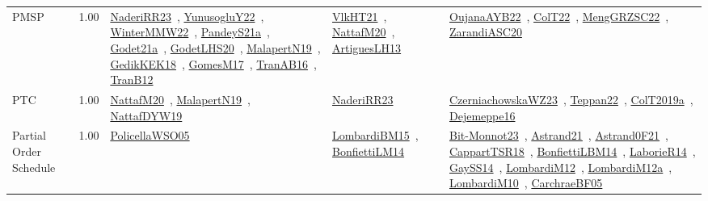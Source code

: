 {\begin{longtable}{p{3cm}r>{\raggedright\arraybackslash}p{6cm}>{\raggedright\arraybackslash}p{6cm}>{\raggedright\arraybackslash}p{8cm}}
\index{PMSP}\index{Classification!PMSP}PMSP &  1.00 & \href{../works/NaderiRR23.pdf}{NaderiRR23}~\cite{NaderiRR23}, \href{../works/YunusogluY22.pdf}{YunusogluY22}~\cite{YunusogluY22}, \href{../works/WinterMMW22.pdf}{WinterMMW22}~\cite{WinterMMW22}, \href{../works/PandeyS21a.pdf}{PandeyS21a}~\cite{PandeyS21a}, \href{../works/Godet21a.pdf}{Godet21a}~\cite{Godet21a}, \href{../works/GodetLHS20.pdf}{GodetLHS20}~\cite{GodetLHS20}, \href{../works/MalapertN19.pdf}{MalapertN19}~\cite{MalapertN19}, \href{../works/GedikKEK18.pdf}{GedikKEK18}~\cite{GedikKEK18}, \href{../works/GomesM17.pdf}{GomesM17}~\cite{GomesM17}, \href{../works/TranAB16.pdf}{TranAB16}~\cite{TranAB16}, \href{../works/TranB12.pdf}{TranB12}~\cite{TranB12} & \href{../works/VlkHT21.pdf}{VlkHT21}~\cite{VlkHT21}, \href{../works/NattafM20.pdf}{NattafM20}~\cite{NattafM20}, \href{../works/ArtiguesLH13.pdf}{ArtiguesLH13}~\cite{ArtiguesLH13} & \href{../works/OujanaAYB22.pdf}{OujanaAYB22}~\cite{OujanaAYB22}, \href{../works/ColT22.pdf}{ColT22}~\cite{ColT22}, \href{../works/MengGRZSC22.pdf}{MengGRZSC22}~\cite{MengGRZSC22}, \href{../works/ZarandiASC20.pdf}{ZarandiASC20}~\cite{ZarandiASC20}\\
\index{PTC}\index{Classification!PTC}PTC &  1.00 & \href{../works/NattafM20.pdf}{NattafM20}~\cite{NattafM20}, \href{../works/MalapertN19.pdf}{MalapertN19}~\cite{MalapertN19}, \href{../works/NattafDYW19.pdf}{NattafDYW19}~\cite{NattafDYW19} & \href{../works/NaderiRR23.pdf}{NaderiRR23}~\cite{NaderiRR23} & \href{../works/CzerniachowskaWZ23.pdf}{CzerniachowskaWZ23}~\cite{CzerniachowskaWZ23}, \href{../works/Teppan22.pdf}{Teppan22}~\cite{Teppan22}, \href{../works/ColT2019a.pdf}{ColT2019a}~\cite{ColT2019a}, \href{../works/Dejemeppe16.pdf}{Dejemeppe16}~\cite{Dejemeppe16}\\
\index{Partial Order Schedule}\index{Classification!Partial Order Schedule}Partial Order Schedule &  1.00 & \href{../works/PolicellaWSO05.pdf}{PolicellaWSO05}~\cite{PolicellaWSO05} & \href{../works/LombardiBM15.pdf}{LombardiBM15}~\cite{LombardiBM15}, \href{../works/BonfiettiLM14.pdf}{BonfiettiLM14}~\cite{BonfiettiLM14} & \href{../works/Bit-Monnot23.pdf}{Bit-Monnot23}~\cite{Bit-Monnot23}, \href{../works/Astrand21.pdf}{Astrand21}~\cite{Astrand21}, \href{../works/Astrand0F21.pdf}{Astrand0F21}~\cite{Astrand0F21}, \href{../works/CappartTSR18.pdf}{CappartTSR18}~\cite{CappartTSR18}, \href{../works/BonfiettiLBM14.pdf}{BonfiettiLBM14}~\cite{BonfiettiLBM14}, \href{../works/LaborieR14.pdf}{LaborieR14}~\cite{LaborieR14}, \href{../works/GaySS14.pdf}{GaySS14}~\cite{GaySS14}, \href{../works/LombardiM12.pdf}{LombardiM12}~\cite{LombardiM12}, \href{../works/LombardiM12a.pdf}{LombardiM12a}~\cite{LombardiM12a}, \href{../works/LombardiM10.pdf}{LombardiM10}~\cite{LombardiM10}, \href{../works/CarchraeBF05.pdf}{CarchraeBF05}~\cite{CarchraeBF05}\\

\end{longtable}}

